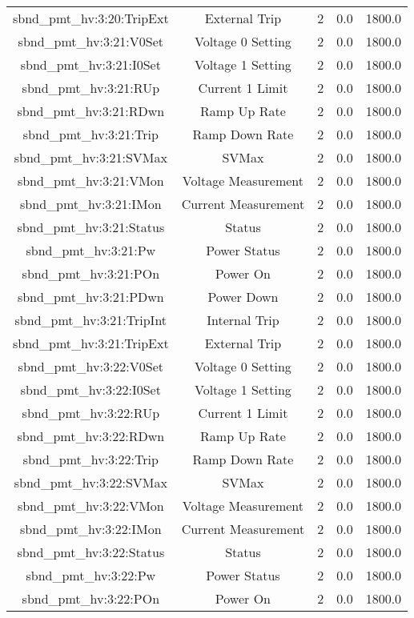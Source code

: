 \begin{table}[ptb]
\begin{tabular}{c | c c c c}
sbnd_pmt_hv:3:20:TripExt & External Trip & 2 & 0.0 & 1800.0\\ 
sbnd_pmt_hv:3:21:V0Set & Voltage 0 Setting & 2 & 0.0 & 1800.0\\ 
sbnd_pmt_hv:3:21:I0Set & Voltage 1 Setting & 2 & 0.0 & 1800.0\\ 
sbnd_pmt_hv:3:21:RUp & Current 1 Limit & 2 & 0.0 & 1800.0\\ 
sbnd_pmt_hv:3:21:RDwn & Ramp Up Rate & 2 & 0.0 & 1800.0\\ 
sbnd_pmt_hv:3:21:Trip & Ramp Down Rate & 2 & 0.0 & 1800.0\\ 
sbnd_pmt_hv:3:21:SVMax & SVMax & 2 & 0.0 & 1800.0\\ 
sbnd_pmt_hv:3:21:VMon & Voltage Measurement & 2 & 0.0 & 1800.0\\ 
sbnd_pmt_hv:3:21:IMon & Current Measurement & 2 & 0.0 & 1800.0\\ 
sbnd_pmt_hv:3:21:Status & Status & 2 & 0.0 & 1800.0\\ 
sbnd_pmt_hv:3:21:Pw & Power Status & 2 & 0.0 & 1800.0\\ 
sbnd_pmt_hv:3:21:POn & Power On & 2 & 0.0 & 1800.0\\ 
sbnd_pmt_hv:3:21:PDwn & Power Down & 2 & 0.0 & 1800.0\\ 
sbnd_pmt_hv:3:21:TripInt & Internal Trip & 2 & 0.0 & 1800.0\\ 
sbnd_pmt_hv:3:21:TripExt & External Trip & 2 & 0.0 & 1800.0\\ 
sbnd_pmt_hv:3:22:V0Set & Voltage 0 Setting & 2 & 0.0 & 1800.0\\ 
sbnd_pmt_hv:3:22:I0Set & Voltage 1 Setting & 2 & 0.0 & 1800.0\\ 
sbnd_pmt_hv:3:22:RUp & Current 1 Limit & 2 & 0.0 & 1800.0\\ 
sbnd_pmt_hv:3:22:RDwn & Ramp Up Rate & 2 & 0.0 & 1800.0\\ 
sbnd_pmt_hv:3:22:Trip & Ramp Down Rate & 2 & 0.0 & 1800.0\\ 
sbnd_pmt_hv:3:22:SVMax & SVMax & 2 & 0.0 & 1800.0\\ 
sbnd_pmt_hv:3:22:VMon & Voltage Measurement & 2 & 0.0 & 1800.0\\ 
sbnd_pmt_hv:3:22:IMon & Current Measurement & 2 & 0.0 & 1800.0\\ 
sbnd_pmt_hv:3:22:Status & Status & 2 & 0.0 & 1800.0\\ 
sbnd_pmt_hv:3:22:Pw & Power Status & 2 & 0.0 & 1800.0\\ 
sbnd_pmt_hv:3:22:POn & Power On & 2 & 0.0 & 1800.0\\ 

\end{tabular}
\end{table}
